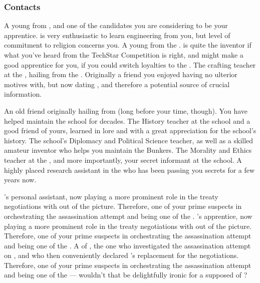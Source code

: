 \documentclass[char]{GL2020}
\begin{document}
\subsubsection*{Contacts}

\begin{contacts}
    \contact{\cInitiate{}} A young \cInitiate{\person} from \pShip{}, and one of the candidates you are considering to be your apprentice. \cInitiate{} is very enthusiastic to learn engineering from you, but \cInitiate{\their} level of commitment to religion concerns you.
    \contact{\cTechStar{}} A young \cTechStar{\person} from the \pTech{}. \cTechStar{} is quite the inventor if what you've heard from the TechStar Competition is right, and might make a good apprentice for you, if you could switch \cTechStar{\their} loyalties to the \pShip{}.
    \contact{\cPirate{}} The crafting teacher at the \pSchool{}, hailing from the \pShip{}. Originally a friend you enjoyed having no ulterior motives with, but now dating \cPrince{}, and therefore a potential source of crucial information.
\end{contacts}


\begin{contacts}
    \contact{\cPrincipal{}} An old friend originally hailing from \pShip{} (long before your time, though). You have helped \cPrincipal{\them} maintain the school for decades.
    \contact{\cHistory{}} The History teacher at the school and a good friend of yours, learned in lore and with a great appreciation for the school's history.
    \contact{\cChupInventor{}} The school’s Diplomacy and Political Science teacher, as well as a skilled amateur inventor who helps you maintain the Bunkers. 
    \contact{\cEthics{}} The Morality and Ethics teacher at the \pSchool{}, and more importantly, your secret informant at the school.
    \contact{\cAssistantScientist{}} A highly placed research assistant in the \pTech{} who has been passing you secrets for a few years now.
\end{contacts}

\begin{contacts}
    \contact{\cChupLeader{}} \cHeadDiplomat{}'s personal assistant, now playing a more prominent role in the treaty negotiations with \cHeadDiplomat{} out of the picture. Therefore, one of your prime suspects in orchestrating the assassination attempt and being one of the \pGoaties{}.
    \contact{\cJuniorStatesman{}} \cHeadDiplomat{}'s apprentice, now playing a more prominent role in the treaty negotiations with \cHeadDiplomat{} out of the picture. Therefore, one of your prime suspects in orchestrating the assassination attempt and being one of the \pGoaties{}.
    \contact{\cEbbPriest{}} A \cEbbPriest{\cleric} of \cEbb{}, the one who investigated the assassination attempt on \cHeadDiplomat{}, and who then conveniently declared \cEbbPriest{\themself} \cHeadDiplomat{}'s replacement for the negotiations. Therefore, one of your prime suspects in orchestrating the assassination attempt and being one of the \pGoaties{} — wouldn't that be delightfully ironic for a supposed \cEbbPriest{\cleric} of \cEbb{}?
\end{contacts}
\end{document}

